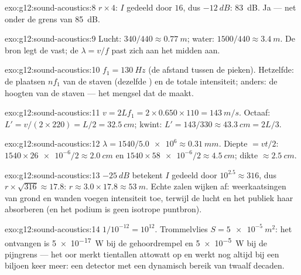 \begin{solution}{exo:g12:sound-acoustics:8}
$r \times 4$: $I$ gedeeld door $16$, dus $-\qty{12}{dB}$: \qty{83}{dB}.
Ja --- net onder de grens van \qty{85}{dB}.
\end{solution}

\begin{solution}{exo:g12:sound-acoustics:9}
Lucht: $340/440 \approx \qty{0.77}{m}$; water:
$1500/440 \approx \qty{3.4}{m}$. De bron legt de  vast; de
 $\lambda = v/f$ past zich aan het midden aan.
\end{solution}

\begin{solution}{exo:g12:sound-acoustics:10}
$f_1 = \qty{130}{Hz}$ (de afstand tussen de pieken). Hetzelfde: de
plaatsen $nf_1$ van de staven (dezelfde ) en de totale
intensiteit; anders: de hoogten van de staven --- het mengsel dat de
 maakt.
\end{solution}

\begin{solution}{exo:g12:sound-acoustics:11}
$v = 2Lf_1 = 2 \times 0.650 \times 110 = \qty{143}{m/s}$. Octaaf:
$L' = v/(2 \times 220) = L/2 = \qty{32.5}{cm}$; kwint:
$L' = 143/330 \approx \qty{43.3}{cm} = 2L/3$.
\end{solution}

\begin{solution}{exo:g12:sound-acoustics:12}
$\lambda = 1540/\num{5.0e6} \approx \qty{0.31}{mm}$. Diepte $= vt/2$:
$1540 \times \num{26e-6}/2 \approx \qty{2.0}{cm}$ en
$1540 \times \num{58e-6}/2 \approx \qty{4.5}{cm}$; dikte
$\approx \qty{2.5}{cm}$.
\end{solution}

\begin{solution}{exo:g12:sound-acoustics:13}
$-\qty{25}{dB}$ betekent $I$ gedeeld door $10^{2.5} \approx 316$, dus
$r \times \sqrt{316} \approx 17.8$: $r \approx 3.0 \times 17.8
\approx \qty{53}{m}$. Echte zalen wijken af: weerkaatsingen van grond en
wanden voegen intensiteit toe, terwijl de lucht en het publiek haar
absorberen (en het podium is geen isotrope puntbron).
\end{solution}

\begin{solution}{exo:g12:sound-acoustics:14}
$1/10^{-12} = 10^{12}$. Trommelvlies $S = \qty{5e-5}{m^2}$: het ontvangen
 is \qty{5e-17}{W} bij de gehoordrempel en \qty{5e-5}{W} bij de
pijngrens --- het oor merkt tientallen attowatt op en werkt nog altijd bij
een biljoen keer meer: een detector met een dynamisch bereik van twaalf
decaden.
\end{solution}

